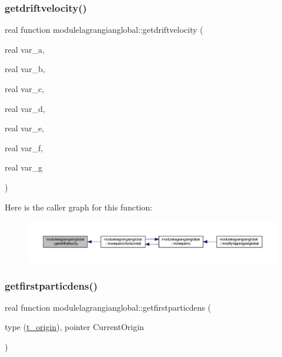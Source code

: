 \mbox{\label{namespacemodulelagrangianglobal_a51b510de4fae6141e3b324bc961177d9}} 
\subsubsection{\texorpdfstring{getdriftvelocity()}{getdriftvelocity()}}
{\footnotesize\ttfamily real function modulelagrangianglobal\+::getdriftvelocity (\begin{DoxyParamCaption}\item[{real}]{var\+\_\+a,  }\item[{real}]{var\+\_\+b,  }\item[{real}]{var\+\_\+c,  }\item[{real}]{var\+\_\+d,  }\item[{real}]{var\+\_\+e,  }\item[{real}]{var\+\_\+f,  }\item[{real}]{var\+\_\+g }\end{DoxyParamCaption})\hspace{0.3cm}{\ttfamily [private]}}

Here is the caller graph for this function\+:\nopagebreak
\begin{figure}[H]
\begin{center}
\leavevmode
\includegraphics[width=350pt]{namespacemodulelagrangianglobal_a51b510de4fae6141e3b324bc961177d9_icgraph}
\end{center}
\end{figure}
\mbox{\label{namespacemodulelagrangianglobal_a419bd4bef813f469c2fc04f9e386890e}} 
\subsubsection{\texorpdfstring{getfirstparticdens()}{getfirstparticdens()}}
{\footnotesize\ttfamily real function modulelagrangianglobal\+::getfirstparticdens (\begin{DoxyParamCaption}\item[{type (\mbox{\hyperlink{structmodulelagrangianglobal_1_1t__origin}{t\+\_\+origin}}), pointer}]{Current\+Origin }\end{DoxyParamCaption})\hspace{0.3cm}{\ttfamily [private]}}

